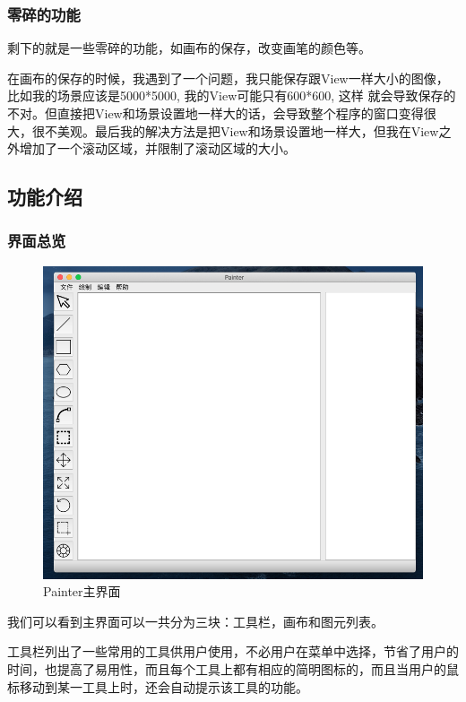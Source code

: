 \documentclass[a4paper,UTF8]{article}
\theoremstyle{definition}
\begin{document}
\subsubsection{零碎的功能}

剩下的就是一些零碎的功能，如画布的保存，改变画笔的颜色等。

在画布的保存的时候，我遇到了一个问题，我只能保存跟View一样大小的图像，比如我的场景应该是5000*5000, 我的View可能只有600*600, 这样
就会导致保存的不对。但直接把View和场景设置地一样大的话，会导致整个程序的窗口变得很大，很不美观。最后我的解决方法是把View和场景设置地一样大，但我在View之外增加了一个滚动区域，并限制了滚动区域的大小。



\subsection{功能介绍}

\subsubsection{界面总览}

\begin{figure}[H]
    \centering
    \includegraphics[scale=0.5]{Painter.png}
    \caption{Painter主界面}
\end{figure}

我们可以看到主界面可以一共分为三块：工具栏，画布和图元列表。

工具栏列出了一些常用的工具供用户使用，不必用户在菜单中选择，节省了用户的时间，也提高了易用性，而且每个工具上都有相应的简明图标的，而且当用户的鼠标移动到某一工具上时，还会自动提示该工具的功能。
\end{document}
